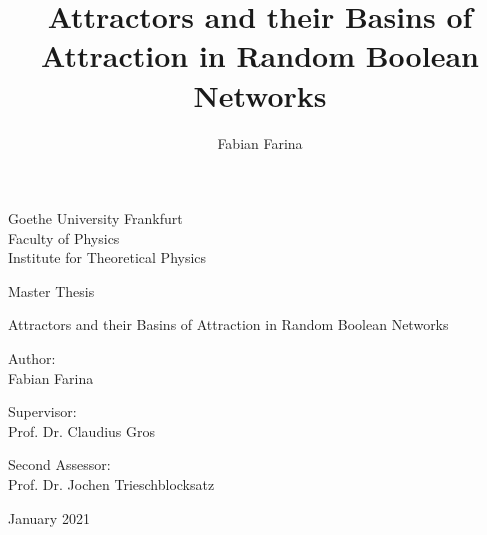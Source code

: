 \documentclass[11pt,a4paper,openleft]{book}
\author{Fabian Farina}
\title{Attractors and their Basins of Attraction in Random Boolean Networks}
\begin{document}
	\thispagestyle{empty}
	\begin{center}
		\begin{minipage}{0.85\linewidth}
			\centering
			\vspace*{3.5cm}
            {{\Large Goethe University Frankfurt\\
            		\vspace*{0.2cm}
            		\large Faculty of Physics\\
            		Institute for Theoretical Physics\par}}
			\vspace*{2.5cm}
			{\large Master Thesis\par}
			\vspace*{1.5cm}
			{{\Large Attractors and their Basins of Attraction in Random Boolean Networks\par}}
			\vspace*{3cm}
			{Author:\\
				Fabian Farina\par}
			\vspace{1cm}
		    \begin{minipage}{0.645\linewidth}
		    	{Supervisor:\\
		    		Prof. Dr. Claudius Gros\par}
		    \end{minipage}
	    \begin{minipage}{0.345\linewidth}
	    	{\flushright Second Assessor:\\
	    		Prof. Dr. Jochen Trieschblocksatz\par}
	    \end{minipage}
        \begin{minipage}{\linewidth}
        	{\centering\vspace{3.5cm}
        		{\Large January 2021}\par}
        \end{minipage}
		\end{minipage}
	\end{center}
	\clearpage
	\restoregeometry
\newpage
\thispagestyle{empty}
\clearpage
\tableofcontents
\thispagestyle{empty}
\clearpage
\thispagestyle{empty}
\clearpage

\setcounter{page}{1}















\end{document}
